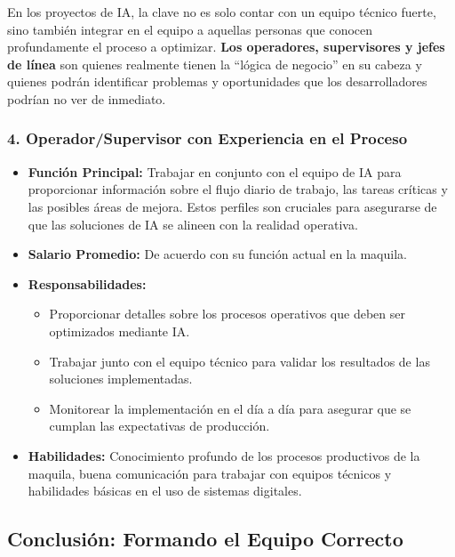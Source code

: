 \documentclass[
  10pt,
  letterpaper,
]{book}
\providecommand{\tightlist}{%
  \setlength{\itemsep}{0pt}\setlength{\parskip}{0pt}}\usepackage{longtable,booktabs,array}
\begin{document}
En los proyectos de IA, la clave no es solo contar con un equipo técnico
fuerte, sino también integrar en el equipo a aquellas personas que
conocen profundamente el proceso a optimizar. \textbf{Los operadores,
supervisores y jefes de línea} son quienes realmente tienen la ``lógica
de negocio'' en su cabeza y quienes podrán identificar problemas y
oportunidades que los desarrolladores podrían no ver de inmediato.

\subsubsection{\texorpdfstring{4. \textbf{Operador/Supervisor con
Experiencia en el
Proceso}}{4. Operador/Supervisor con Experiencia en el Proceso}}\label{operadorsupervisor-con-experiencia-en-el-proceso}

\begin{itemize}
\tightlist
\item
  \textbf{Función Principal:} Trabajar en conjunto con el equipo de IA
  para proporcionar información sobre el flujo diario de trabajo, las
  tareas críticas y las posibles áreas de mejora. Estos perfiles son
  cruciales para asegurarse de que las soluciones de IA se alineen con
  la realidad operativa.
\item
  \textbf{Salario Promedio:} De acuerdo con su función actual en la
  maquila.
\item
  \textbf{Responsabilidades:}

  \begin{itemize}
  \tightlist
  \item
    Proporcionar detalles sobre los procesos operativos que deben ser
    optimizados mediante IA.
  \item
    Trabajar junto con el equipo técnico para validar los resultados de
    las soluciones implementadas.
  \item
    Monitorear la implementación en el día a día para asegurar que se
    cumplan las expectativas de producción.
  \end{itemize}
\item
  \textbf{Habilidades:} Conocimiento profundo de los procesos
  productivos de la maquila, buena comunicación para trabajar con
  equipos técnicos y habilidades básicas en el uso de sistemas
  digitales.
\end{itemize}

\subsection{\texorpdfstring{\textbf{Conclusión: Formando el Equipo
Correcto}}{Conclusión: Formando el Equipo Correcto}}\label{conclusiuxf3n-formando-el-equipo-correcto}
\end{document}
